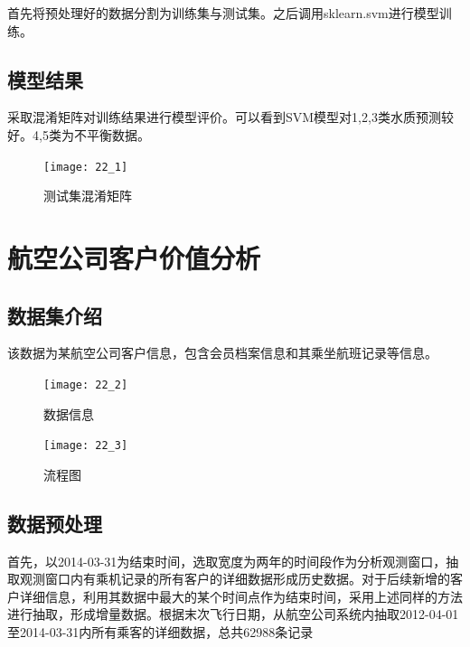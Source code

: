 \documentclass[withoutpreface,bwprint]{cumcmthesis} %
\begin{document}
\par 首先将预处理好的数据分割为训练集与测试集。之后调用sklearn.svm进行模型训练。



\subsection{模型结果}
\par 采取混淆矩阵对训练结果进行模型评价。可以看到SVM模型对1,2,3类水质预测较好。4,5类为不平衡数据。

\begin{figure}[H]
	\centering
	\centerline{\texttt{[image: 22\_1]}}  
	\begin{center}
		\caption{测试集混淆矩阵}
	\end{center}
\end{figure}




\newpage

\section{航空公司客户价值分析}
\subsection{数据集介绍}
\par 该数据为某航空公司客户信息，包含会员档案信息和其乘坐航班记录等信息。
\begin{figure}[H]
	\centering
	\centerline{\texttt{[image: 22\_2]}}  
	\begin{center}
		\caption{数据信息}
	\end{center}
\end{figure}
\begin{figure}[H]
	\centering
	\centerline{\texttt{[image: 22\_3]}}  
	\begin{center}
		\caption{流程图}
	\end{center}
\end{figure}

\subsection{数据预处理}
\par 首先，以2014-03-31为结束时间，选取宽度为两年的时间段作为分析观测窗口，抽取观测窗口内有乘机记录的所有客户的详细数据形成历史数据。对于后续新增的客户详细信息，利用其数据中最大的某个时间点作为结束时间，采用上述同样的方法进行抽取，形成增量数据。根据末次飞行日期，从航空公司系统内抽取2012-04-01至2014-03-31内所有乘客的详细数据，总共62988条记录
\end{document}
